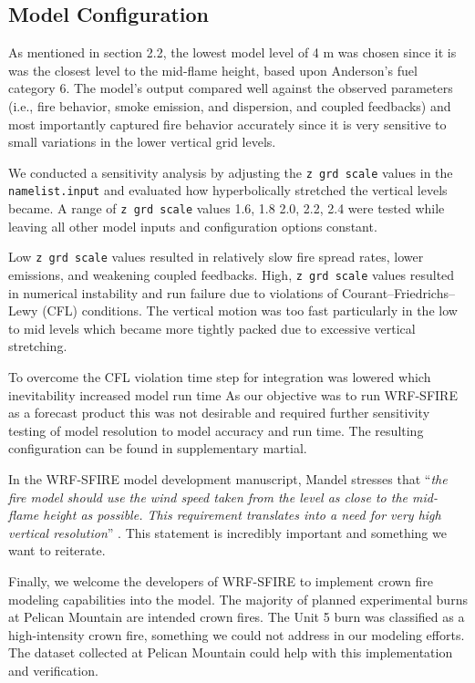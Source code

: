 \documentclass[preprints,article,accept,moreauthors,pdftex]{Definitions/mdpi}
\begin{document}
\subsection{Model Configuration}

As mentioned in section 2.2, the lowest model level of 4 m was chosen since it is was the closest level to the mid-flame height, based upon Anderson’s fuel category 6. The model’s output compared well against the observed parameters (i.e., fire behavior, smoke emission, and dispersion, and coupled feedbacks) and most importantly captured fire behavior accurately since it is very sensitive to small variations in the lower vertical grid levels.

We conducted a sensitivity analysis by adjusting the \texttt{z grd scale} values in the \texttt{namelist.input} and evaluated how hyperbolically stretched the vertical levels became. A range of \texttt{z grd scale} values 1.6, 1.8 2.0, 2.2, 2.4 were tested while leaving all other model inputs and configuration options constant.

Low \texttt{z grd scale} values resulted in relatively slow fire spread rates, lower emissions, and weakening coupled feedbacks. High, \texttt{z grd scale} values resulted in numerical instability and run failure due to violations of Courant–Friedrichs–Lewy (CFL) conditions. The vertical motion was too fast particularly in the low to mid levels which became more tightly packed due to excessive vertical stretching.

To overcome the CFL violation time step for integration was lowered which inevitability increased model run time As our objective was to run WRF-SFIRE as a forecast product this was not desirable and required further sensitivity testing of model resolution to model accuracy and run time. The resulting configuration can be found in supplementary martial.


In the WRF-SFIRE model development manuscript, Mandel stresses that ``\textit{the fire model should use the wind speed taken from the level as close to the mid-flame height as possible. This requirement translates into a need for very high vertical resolution}'' \cite{mandel_coupled_2011}. This statement is incredibly important and something we want to reiterate.

Finally, we welcome the developers of WRF-SFIRE to implement crown fire modeling capabilities into the model. The majority of planned experimental burns at Pelican Mountain are intended crown fires. The Unit 5 burn was classified as a high-intensity crown fire, something we could not address in our modeling efforts. The dataset collected at Pelican Mountain could help with this implementation and verification.
\end{document}
